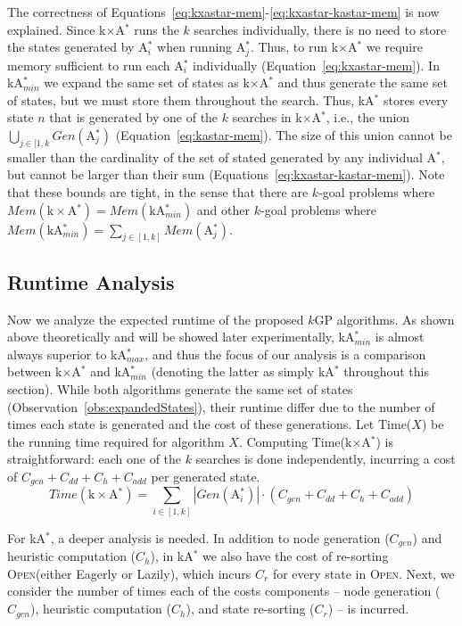 \documentclass{aicom2e}
\newcommand{\kgs}{$k$GP}
\newcommand{\astar}{A$^*$}
\newcommand{\kastar}{kA$^*$}
\newcommand{\kastarmin}{kA$^*_{min}$}
\newcommand{\kastarmax}{kA$^*_{max}$}
\newcommand{\kxastar}{k$\times$A$^*$}
\newcommand{\astari}[1]{A$^*_#1$}
\newcommand{\open}{\textsc{Open}}
\begin{document}
The correctness of Equations~\ref{eq:kxastar-mem}-\ref{eq:kxastar-kastar-mem}
is now explained. Since \kxastar{} runs the $k$ searches individually, there is
no need to store the states generated by \astari{i} when running \astari{j}.
Thus, to run \kxastar{} we require memory sufficient to run each \astari{i}
individually (Equation~\ref{eq:kxastar-mem}). In \kastarmin{} we expand the
same set of states as \kxastar{} and thus generate the same set of states, but
we must store them throughout the search. Thus, \kastar{} stores every state
$n$ that is  generated by one of the $k$ searches in \kxastar{}, i.e., the
union $\bigcup_{j\in[1,k}Gen(\text{\astari{j}})$
(Equation~\ref{eq:kastar-mem}). The size of this union cannot be smaller than
the cardinality of the set of stated generated by any individual \astar{}, but
cannot be larger than their sum (Equations~\ref{eq:kxastar-kastar-mem}). Note
that these bounds are tight, in the sense that there are $k$-goal problems
where $Mem(\text{\kxastar{}}) = Mem(\text{\kastarmin{}})$ and other $k$-goal
problems where $Mem(\text{\kastarmin{}}) = \sum_{j\in[1,k]}
Mem(\text{\astari{j}})$.


\subsection{Runtime Analysis}

Now we analyze the expected runtime of the proposed \kgs{} algorithms. As shown
above theoretically and will be showed later experimentally, \kastarmin{} is
almost always superior to \kastarmax{}, and thus the focus of our analysis is a
comparison between \kxastar{} and \kastarmin{} (denoting the latter as simply \kastar{} throughout this section).  While both algorithms generate
the same set of states (Observation~\ref{obs:expandedStates}), their runtime
differ due to the number of times each state is generated and the cost of these
generations. Let Time($X$) be the running time required for algorithm $X$.
Computing Time(\kxastar{}) is straightforward: each one of the $k$ searches is
done independently, incurring a cost of $C_{gen}+C_{dd}+C_h+C_{add}$ per
generated state.
\[
Time(\text{\kxastar{}}) = \sum_{i\in[1,k]} |Gen(\text{\astari{i}})|\cdot (C_{gen}+C_{dd}+C_h+C_{add})
\]

For \kastar{}, a deeper analysis is needed. In addition to node generation ($C_{gen}$) and heuristic computation ($C_h$), in \kastar{} we also have the cost of re-sorting \open (either Eagerly or Lazily), which incurs $C_r$ for every state in \open{}.
Next, we consider the number of
times each of the costs components -- node generation ($C_{gen}$), heuristic computation ($C_h$), and state re-sorting ($C_r$) -- is incurred.
\end{document}
